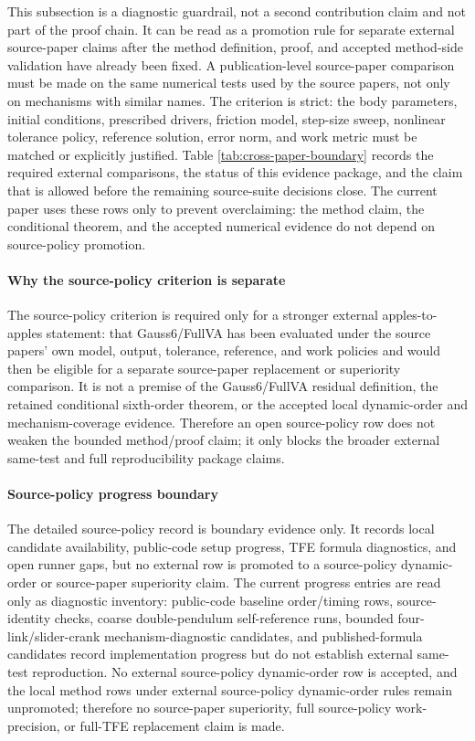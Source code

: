 \documentclass[preprint,12pt]{elsarticle}
\newcommand{\method}{Gauss6\slash FullVA}
\newcommand{\tfe}{TFE}
\begin{document}
This subsection is a diagnostic guardrail, not a second contribution claim
and not part of the proof chain. It can be read as a promotion rule for separate
external source-paper claims after the method definition, proof, and accepted
method-side validation have already been fixed. A publication-level
source-paper comparison must be made on the same numerical tests used by the
source papers, not only on mechanisms with similar names. The criterion is
strict:
the body parameters, initial conditions, prescribed drivers, friction model,
step-size sweep, nonlinear tolerance policy, reference solution, error norm,
and work metric must be matched or explicitly justified. Table
\ref{tab:cross-paper-boundary} records the required external comparisons, the
status of this evidence package, and the claim that is allowed before
the remaining source-suite decisions close. The current paper uses these rows
only to prevent overclaiming: the method claim, the conditional theorem, and
the accepted numerical evidence do not depend on source-policy promotion.

\paragraph{Why the source-policy criterion is separate}
The source-policy criterion is required only for a stronger external
apples-to-apples statement: that \method{} has been evaluated under the
source papers' own model, output, tolerance, reference, and work policies and
would then be eligible for a separate source-paper replacement or superiority
comparison.
It is not a premise of the Gauss6/FullVA residual definition, the retained
conditional sixth-order theorem, or the accepted local dynamic-order and
mechanism-coverage evidence.  Therefore an open source-policy row does not
weaken the bounded method/proof claim; it only blocks the broader external
same-test and full reproducibility package claims.

\paragraph{Source-policy progress boundary}
The detailed source-policy record is boundary evidence only. It records local
candidate availability, public-code setup progress, \tfe{} formula diagnostics,
and open runner gaps, but no external row is promoted to a source-policy
dynamic-order or source-paper superiority claim.
The current progress entries are read only as diagnostic inventory: public-code
baseline order/timing rows, source-identity checks, coarse double-pendulum
self-reference runs, bounded four-link/slider-crank mechanism-diagnostic candidates, and
published-formula candidates record implementation progress but do not
establish external same-test reproduction.  No external source-policy
dynamic-order row is accepted, and the local method rows under external
source-policy dynamic-order rules remain unpromoted; therefore no
source-paper superiority, full source-policy work-precision, or full-\tfe{}
replacement claim is made.
\end{document}
